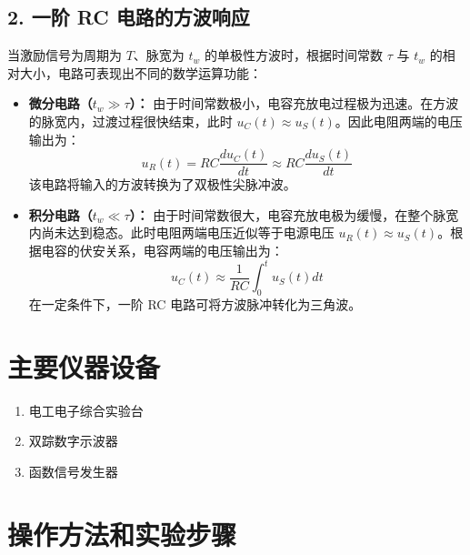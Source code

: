 ﻿\documentclass[10.5pt]{config}
\begin{document}
\subsection*{2. 一阶 RC 电路的方波响应}

当激励信号为周期为 $T$、脉宽为 $t_w$ 的单极性方波时，根据时间常数 $\tau$ 与 $t_w$ 的相对大小，电路可表现出不同的数学运算功能：

\begin{itemize}[leftmargin=2em]
    \item \textbf{微分电路（$t_w \gg \tau$）：} 
    由于时间常数极小，电容充放电过程极为迅速。在方波的脉宽内，过渡过程很快结束，此时 $u_C(t) \approx u_S(t)$。因此电阻两端的电压输出为：
    \begin{equation*}
        u_R(t) = RC \frac{du_C(t)}{dt} \approx RC \frac{du_S(t)}{dt}
    \end{equation*}
    该电路将输入的方波转换为了双极性尖脉冲波。

    \item \textbf{积分电路（$t_w \ll \tau$）：}
    由于时间常数很大，电容充放电极为缓慢，在整个脉宽内尚未达到稳态。此时电阻两端电压近似等于电源电压 $u_R(t) \approx u_S(t)$。根据电容的伏安关系，电容两端的电压输出为：
    \begin{equation*}
        u_C(t) \approx \frac{1}{RC} \int_0^t u_S(t) dt
    \end{equation*}
    在一定条件下，一阶 RC 电路可将方波脉冲转化为三角波。
\end{itemize}


\section{主要仪器设备}
\begin{enumerate}[label=\arabic*., leftmargin=2em]
    \item 电工电子综合实验台
    \item 双踪数字示波器
    \item 函数信号发生器
\end{enumerate}


\section{操作方法和实验步骤}
\end{document}
